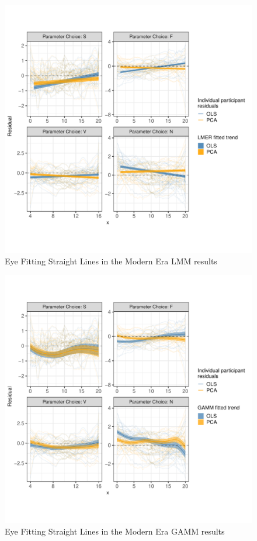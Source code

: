 \documentclass[12pt]{article}
\begin{document}
\begin{figure}[tbp]

{\centering \includegraphics[width=0.9\linewidth,]{Eye-Fitting-Stright-Lines-in-the-Modern-Era_files/figure-latex/eyefitting-lmer-residualplots-1} 

}

\caption{Eye Fitting Straight Lines in the Modern Era LMM results}\label{fig:eyefitting-lmer-residualplots}
\end{figure}

\begin{figure}[tbp]

{\centering \includegraphics[width=0.9\linewidth,]{Eye-Fitting-Stright-Lines-in-the-Modern-Era_files/figure-latex/eyefitting-gamm-residualplots-1} 

}

\caption{Eye Fitting Straight Lines in the Modern Era GAMM results}\label{fig:eyefitting-gamm-residualplots}
\end{figure}
\end{document}
